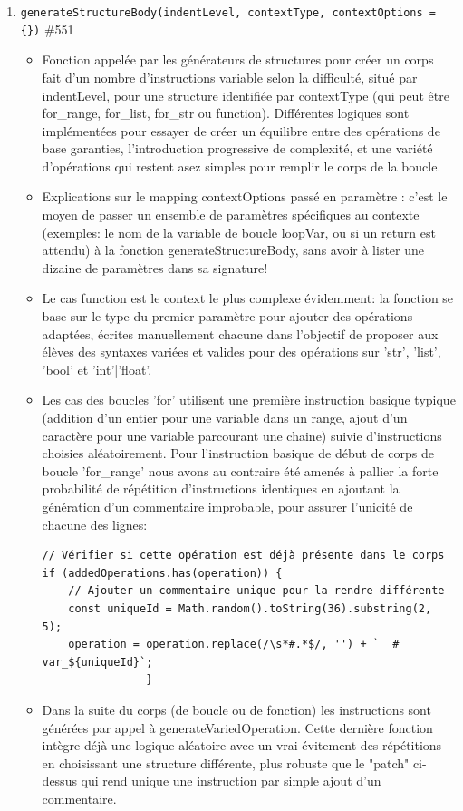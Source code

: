 \documentclass[11pt,a4paper]{article}
\begin{document}
\begin{enumerate}
    \item \texttt{generateStructureBody(indentLevel, contextType, contextOptions = \{\})} \#551
    \begin{itemize}
        \item Fonction appelée par les générateurs de structures pour créer un corps fait d'un nombre d'instructions variable selon la difficulté, situé par indentLevel, pour une structure identifiée par contextType (qui peut être for\_range, for\_list, for\_str ou function). Différentes logiques sont implémentées pour essayer de créer un équilibre entre des opérations de base garanties, l'introduction progressive de complexité, et une variété d'opérations qui restent asez simples pour remplir le corps de la boucle.
        \item Explications sur le mapping contextOptions passé en paramètre : c'est le moyen de passer un ensemble de paramètres spécifiques au contexte (exemples: le nom de la variable de boucle loopVar, ou si un return est attendu) à la fonction generateStructureBody, sans avoir à lister une dizaine de paramètres dans sa signature!
        \item Le cas function est le context le plus complexe évidemment: la fonction se base sur le type du premier paramètre pour ajouter des opérations adaptées, écrites manuellement chacune dans l'objectif de proposer aux élèves des syntaxes variées et valides pour des opérations sur 'str', 'list', 'bool' et 'int'|'float'.
        \item Les cas des boucles 'for' utilisent une première instruction basique typique (addition d'un entier pour une variable dans un range, ajout d'un caractère pour une variable parcourant une chaine) suivie d'instructions choisies aléatoirement. Pour l'instruction basique de début de corps de boucle 'for\_range' nous avons au contraire été amenés à pallier la forte probabilité de répétition d'instructions identiques en ajoutant la génération d'un commentaire improbable, pour assurer l'unicité de chacune des lignes:
        \begin{verbatim}
// Vérifier si cette opération est déjà présente dans le corps
if (addedOperations.has(operation)) {
    // Ajouter un commentaire unique pour la rendre différente
    const uniqueId = Math.random().toString(36).substring(2, 5);
    operation = operation.replace(/\s*#.*$/, '') + `  # var_${uniqueId}`;
                }
        \end{verbatim}
        \item Dans la suite du corps (de boucle ou de fonction) les instructions sont générées par appel à generateVariedOperation. Cette dernière fonction intègre déjà une logique aléatoire avec un vrai évitement des répétitions en choisissant une structure différente, plus robuste que le "patch" ci-dessus qui rend unique une instruction par simple ajout d'un commentaire. 
    \end{itemize}



\end{enumerate}
\end{document}
